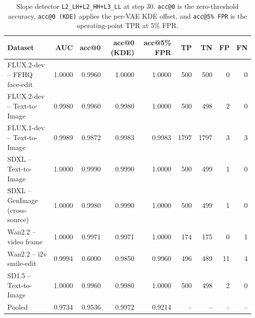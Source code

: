 \begin{table}[t]
\centering
\small
\setlength{\tabcolsep}{5pt}
\begin{tabular}{lrrrrrrrr}
\toprule
Dataset & AUC & acc@0 & acc@0 (KDE) & acc@5\% FPR & TP & TN & FP & FN \\
\midrule
FLUX.2-dev -- FFHQ face-edit          & 1.0000 & 0.9960 & 1.0000 & 1.0000 & 500 & 500 & 0 & 0 \\
FLUX.2-dev -- Text-to-Image           & 0.9980 & 0.9960 & 0.9980 & 1.0000 & 500 & 498 & 2 & 0 \\
FLUX.1-dev -- Text-to-Image           & 0.9989 & 0.9872 & 0.9983 & 0.9983 & 1797 & 1797 & 3 & 3 \\
SDXL -- Text-to-Image                 & 1.0000 & 0.9990 & 0.9990 & 1.0000 & 500 & 499 & 1 & 0 \\
SDXL -- GenImage (cross-source)       & 1.0000 & 0.9980 & 0.9990 & 1.0000 & 500 & 499 & 1 & 0 \\
Wan2.2 -- video frame                 & 1.0000 & 0.9971 & 0.9971 & 1.0000 & 174 & 175 & 0 & 1 \\
Wan2.2 -- i2v smile-edit              & 0.9994 & 0.6000 & 0.9850 & 0.9960 & 496 & 489 & 11 & 4 \\
SD1.5 -- Text-to-Image                & 1.0000 & 0.9960 & 0.9980 & 1.0000 & 500 & 498 & 2 & 0 \\
\midrule
Pooled                                & 0.9734 & 0.9536 & 0.9972 & 0.9214 & -- & -- & -- & -- \\
\bottomrule
\end{tabular}
\caption{Slope detector \texttt{L2\_LH+L2\_HH+L3\_LL} at step 30. \texttt{acc@0} is the zero-threshold accuracy, \texttt{acc@0 (KDE)} applies the per-VAE KDE offset, and \texttt{acc@5\% FPR} is the operating-point TPR at 5\% FPR.}
\end{table}

